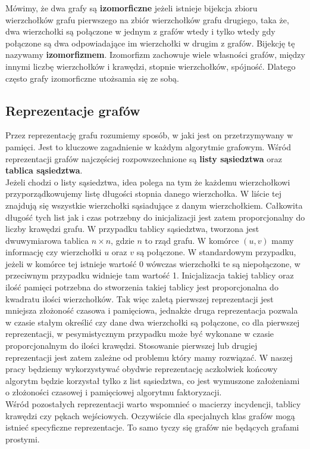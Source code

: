 \documentclass[12pt,a4paper,titlepage]{article}
\newcommand\tab[1][1cm]{\hspace*{#1}}
\begin{document}
Mówimy, że dwa grafy są \textbf{izomorficzne} jeżeli istnieje bijekcja zbioru wierzchołków grafu pierwszego na zbiór wierzchołków grafu drugiego, taka że, dwa wierzchołki są połączone w jednym z grafów wtedy i tylko wtedy gdy połączone są dwa odpowiadające im wierzchołki w drugim z grafów. Bijekcję tę nazywamy \textbf{izomorfizmem}. Izomorfizm zachowuje wiele własności grafów, między innymi liczbę wierzchołków i krawędzi, stopnie wierzchołków, spójność. Dlatego często grafy izomorficzne utożsamia się ze sobą.\\
\subsection{Reprezentacje grafów}
Przez reprezentację grafu rozumiemy sposób, w jaki jest on przetrzymywany w pamięci. Jest to kluczowe zagadnienie w każdym algorytmie grafowym. Wśród reprezentacji grafów najczęściej rozpowszechnione są \textbf{listy sąsiedztwa} oraz \textbf{tablica sąsiedztwa}.\\
\tab[0.6cm]Jeżeli chodzi o listy sąsiedztwa, idea polega na tym że każdemu wierzchołkowi przyporządkowujemy listę długości stopnia danego wierzchołka. W liście tej znajdują się wszystkie wierzchołki sąsiadujące z danym wierzchołkiem. Całkowita długość tych list jak i czas potrzebny do inicjalizacji jest zatem proporcjonalny do liczby krawędzi grafu. W przypadku tablicy sąsiedztwa, tworzona jest dwuwymiarowa tablica $n \times n$, gdzie $n$ to rząd grafu. W komórce $(u,v)$ mamy informację czy wierzchołki $u$ oraz $v$ są połączone. W standardowym przypadku, jeżeli w komórce tej istnieje wartość 0 wówczas wierzchołki te są niepołączone, w przeciwnym przypadku widnieje tam wartość 1. Inicjalizacja takiej tablicy oraz ilość pamięci potrzebna do stworzenia takiej tablicy jest proporcjonalna do kwadratu ilości wierzchołków. Tak więc zaletą pierwszej reprezentacji jest mniejsza złożoność czasowa i pamięciowa, jednakże druga reprezentacja pozwala w czasie stałym określić czy dane dwa wierzchołki są połączone, co dla pierwszej reprezentacji, w pesymistycznym przypadku może być wykonane w czasie proporcjonalnym do ilości krawędzi. Stosowanie pierwszej lub drugiej reprezentacji jest zatem zależne od problemu który mamy rozwiązać. W naszej pracy będziemy wykorzystywać obydwie reprezentację aczkolwiek końcowy algorytm będzie korzystał tylko z list sąsiedztwa, co jest wymuszone założeniami o złożoności czasowej i pamięciowej algorytmu faktoryzacji.\\
\tab[0.6cm]Wśród pozostałych reprezentacji warto wspomnieć o macierzy incydencji, tablicy krawędzi czy pękach wejściowych. Oczywiście dla specjalnych klas grafów mogą istnieć specyficzne reprezentacje. To samo tyczy się grafów nie będących grafami prostymi.
\end{document}
